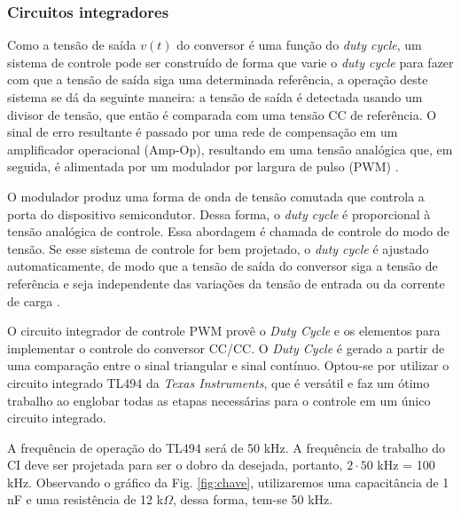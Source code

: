 \subsubsection*{Circuitos integradores}

Como a tensão de saída $v(t)$ do conversor é uma função do \textit{duty cycle}, um sistema de controle pode ser construído de forma que varie o \textit{duty cycle} para fazer com que a tensão de saída siga uma determinada referência, a operação deste sistema se dá da seguinte maneira: a tensão de saída é detectada usando um divisor de tensão, que então é comparada com uma tensão CC de referência. O sinal de erro resultante é passado por uma rede de compensação em um amplificador operacional (Amp-Op), resultando em uma tensão analógica que, em seguida, é alimentada por um modulador por largura de pulso (PWM) \cite{forward}.

O modulador produz uma forma de onda de tensão comutada que controla a porta do dispositivo semicondutor. Dessa forma, o \textit{duty cycle} é proporcional à tensão analógica de controle. Essa abordagem é chamada de controle do modo de tensão. Se esse sistema de controle for bem projetado, o \textit{duty cycle} é ajustado automaticamente, de modo que a tensão de saída do conversor siga a tensão de referência e seja independente das variações da tensão de entrada ou da corrente de carga \cite{forward}.

O circuito integrador de controle PWM provê o \textit{Duty Cycle} e os elementos para implementar o controle do conversor CC/CC. O \textit{Duty Cycle} é gerado a partir de uma comparação entre o sinal triangular e sinal contínuo. Optou-se por utilizar o circuito integrado TL494 da \textit{Texas Instruments}, que é versátil e faz um ótimo trabalho ao englobar todas as etapas necessárias para o controle em um único circuito integrado.

A frequência de operação do TL494 será de 50 kHz. A frequência de trabalho do CI deve ser projetada para ser o dobro da desejada, portanto, $2 \cdot 50$ kHz = 100 kHz. Observando o gráfico da Fig. \ref{fig:chave}, utilizaremos uma capacitância de 1 nF e uma resistência de 12 k$\Omega$, dessa forma, tem-se 50 kHz. 

